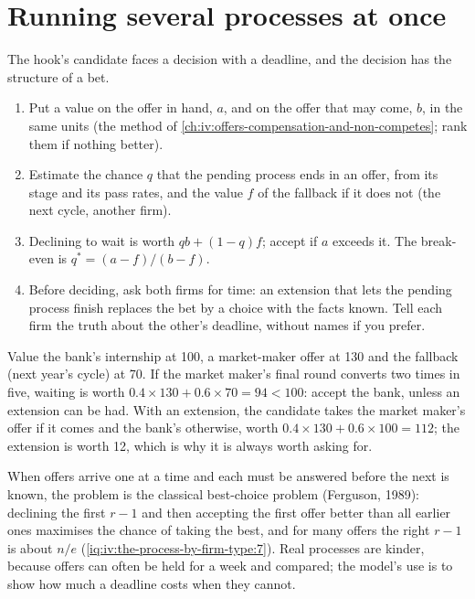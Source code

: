 \section{Running several processes at once}

The hook's candidate faces a decision with a deadline, and the decision has the structure of a bet.

\begin{method}\label{met:iv:the-process-by-firm-type:accept}
\begin{enumerate}
\item Put a value on the offer in hand, $a$, and on the offer that may come, $b$, in the same units (the method of
\cref{ch:iv:offers-compensation-and-non-competes}; rank them if nothing better).
\item Estimate the chance $q$ that the pending process ends in an offer, from its stage and its pass rates,
and the value $f$ of the fallback if it does not (the next cycle, another firm).
\item Declining to wait is worth $qb + (1-q)f$; accept if $a$ exceeds it. The break-even is
$q^\ast = (a - f)/(b - f)$.
\item Before deciding, ask both firms for time: an extension that lets the pending process finish replaces the
bet by a choice with the facts known. Tell each firm the truth about the other's deadline, without names if
you prefer.
\end{enumerate}
\end{method}

\begin{example}\label{ex:iv:the-process-by-firm-type:decision}
Value the bank's internship at 100, a market-maker offer at 130 and the fallback (next year's cycle) at 70. If
the market maker's final round converts two times in five, waiting is worth $0.4 \times 130 + 0.6 \times 70 =
94 < 100$: accept the bank, unless an extension can be had. With an extension, the candidate takes the
market maker's offer if it comes and the bank's otherwise, worth $0.4 \times 130 + 0.6 \times 100 = 112$; the
extension is worth 12, which is why it is always worth asking for.
\end{example}

When offers arrive one at a time and each must be answered before the next is known, the problem is the
classical best-choice problem (Ferguson, 1989): declining the first $r-1$ and then accepting the first offer
better than all earlier ones maximises the chance of taking the best, and for many offers the right $r-1$ is
about $n/e$ (\cref{iq:iv:the-process-by-firm-type:7}). Real processes are kinder, because offers can often be
held for a week and compared; the model's use is to show how much a deadline costs when they cannot.

